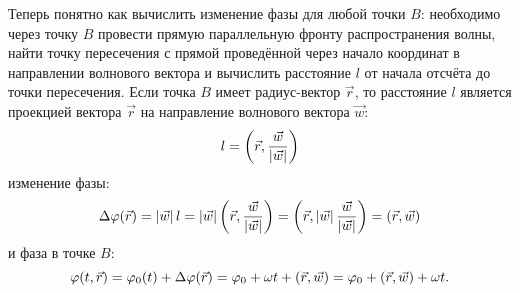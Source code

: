 Теперь понятно как вычислить изменение фазы для любой точки $B$: необходимо через точку $B$ провести прямую параллельную фронту распространения волны, найти точку
пересечения с прямой проведённой через начало координат в направлении волнового вектора и вычислить расстояние $l$ от начала отсчёта до точки пересечения. Если
точка $B$ имеет радиус-вектор $\vec{r}$, то расстояние $l$ является проекцией вектора $\vec{r}$ на направление волнового вектора $\vec{w}$:
\[
    l = \left ( \vec{r}, \frac{\vec{w}}{\left | \vec{w} \right |} \right )
\]
изменение фазы:
\[
    \Delta \varphi ( \vec{r} )
    = \left | \vec{w} \right | l
    = \left | \vec{w} \right | \left ( \vec{r}, \frac{\vec{w}}{\left | \vec{w} \right |} \right )
    = \left ( \vec{r}, \left | \vec{w} \right |  \frac{\vec{w}}{\left | \vec{w} \right |} \right )
    = \left ( \vec{r}, \vec{w} \right )
\]
и фаза в точке $B$:
\[
    \varphi(t, \vec{r})
    = \varphi_0(t) + \Delta \varphi ( \vec{r} )
    = \varphi_0 + \omega t + \left ( \vec{r}, \vec{w} \right )
    = \varphi_0 + \left ( \vec{r}, \vec{w} \right ) + \omega t .
\]

